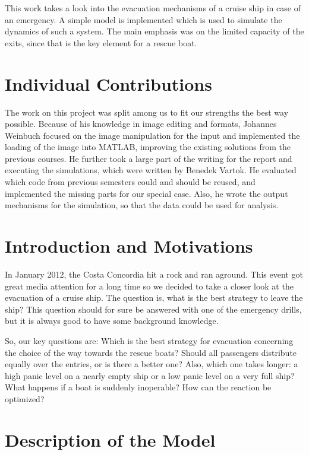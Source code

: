 \documentclass[11pt]{article}
\begin{document}
This work takes a look into the evacuation mechanisms of a cruise ship in case
of an emergency.  A simple model is implemented which is used to simulate the
dynamics of such a system.  The main emphasis was on the limited capacity of
the exits, since that is the key element for a rescue boat. 


\section{Individual Contributions}

The work on this project was split among us to fit our strengths the best way
possible.  Because of his knowledge in image editing and formats, Johannes
Weinbuch focused on the image manipulation for the input and implemented the
loading of the image into MATLAB, improving the existing solutions from the
previous courses. He further took a large part of the writing for the report
and executing the simulations, which were written by Benedek Vartok.  He
evaluated which code from previous semesters could and should be reused, and
implemented the missing parts for our special case.  Also, he wrote the output
mechanisms for the simulation, so that the data could be used for analysis.


\section{Introduction and Motivations}

In January 2012, the Costa Concordia hit a rock and ran aground\cite{bbcnews}.
This event got great media attention for a long time so we decided to take a
closer look at the evacuation of a cruise ship.  The question is, what is the
best strategy to leave the ship?  This question should for sure be answered with
one of the emergency drills, but it is always good to have some background
knowledge.

So, our key questions are: Which is the best strategy for evacuation concerning
the choice of the way towards the rescue boats?  Should all passengers
distribute equally over the entries, or is there a better one? Also, which one
takes longer: a high panic level on a nearly empty ship or a low panic level on
a very full ship?  What happens if a boat is suddenly inoperable? How can the
reaction be optimized?


\section{Description of the Model}
\end{document}
